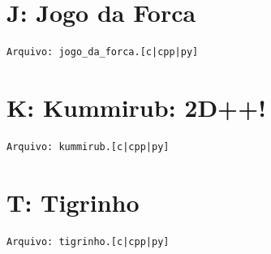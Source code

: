 \documentclass[12pt,oneside]{article} %
\begin{document}
%

\newpage
\section*{J: Jogo da Forca} %
\vspace{-0.52cm}
\noindent \begin{verbatim}Arquivo: jogo_da_forca.[c|cpp|py]\end{verbatim}


\newpage
\section*{K: Kummirub: 2D++!} %
\vspace{-0.52cm}
\noindent \begin{verbatim}Arquivo: kummirub.[c|cpp|py]\end{verbatim}


%

\newpage
\section*{T: Tigrinho} %
\vspace{-0.52cm}
\noindent \begin{verbatim}Arquivo: tigrinho.[c|cpp|py]\end{verbatim}

\end{document}
